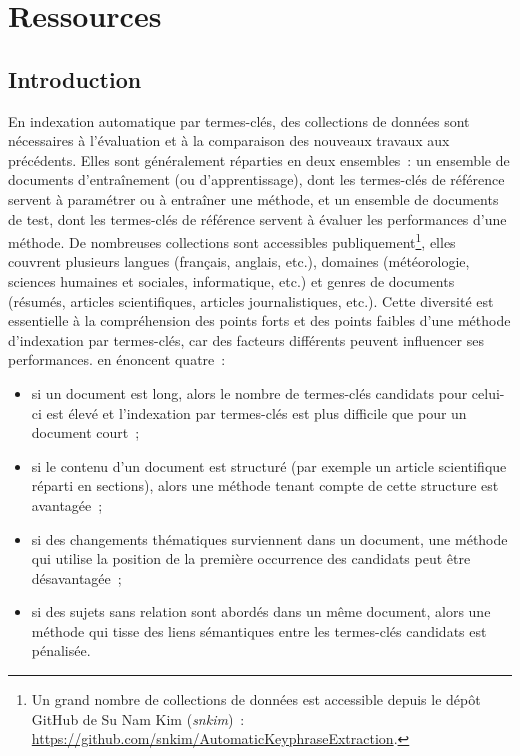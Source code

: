 \chapter{Ressources}
\label{chap:main-data_description}

  \section{Introduction}
  \label{sec:main-data_description-introduction}
    En indexation automatique par termes-clés, des
    collections de données sont nécessaires à l'évaluation et à la comparaison
    des nouveaux travaux aux précédents. Elles sont généralement réparties en
    deux ensembles~: un ensemble de documents d'entraînement (ou
    d'apprentissage), dont les termes-clés de référence servent à paramétrer ou
    à entraîner une méthode, et un ensemble de documents de test, dont les
    termes-clés de référence servent à évaluer les performances d'une méthode.
    De nombreuses collections sont accessibles publiquement\footnote{Un grand
    nombre de collections de données est accessible depuis le dépôt GitHub de Su
    Nam Kim (\textit{snkim})~:
    \url{https://github.com/snkim/AutomaticKeyphraseExtraction}.}, elles
    couvrent plusieurs langues (français, anglais, etc.), domaines
    (météorologie, sciences humaines et sociales, informatique, etc.) et genres
    de documents (résumés, articles scientifiques, articles journalistiques,
    etc.). Cette diversité est essentielle à la compréhension des points forts
    et des points faibles d'une méthode d'indexation par termes-clés, car des
    facteurs différents peuvent influencer ses performances.
     en énoncent quatre~:
    \begin{itemize}
      \item{si un document est long, alors le nombre de termes-clés candidats
            pour celui-ci est élevé et l'indexation par termes-clés est plus
            difficile que pour un document court~;}
      \item{si le contenu d'un document est structuré (par exemple un article
            scientifique réparti en sections), alors une méthode tenant compte
            de cette structure est avantagée~;}
      \item{si des changements thématiques surviennent dans un document, une
            méthode qui utilise la position de la première occurrence des
            candidats peut être désavantagée~;}
      \item{si des sujets sans relation sont abordés dans un même document,
            alors une méthode qui tisse des liens sémantiques entre les
            termes-clés candidats est pénalisée.}
    \end{itemize}

